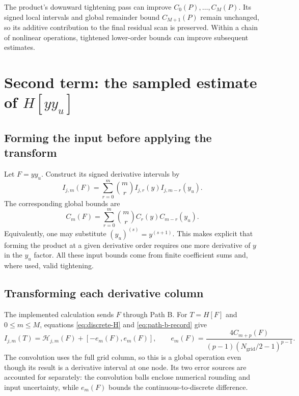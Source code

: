 \documentclass[11pt]{article}
\numberwithin{equation}{section}
\newcommand{\Ngrid}{N_{\mathrm{grid}}}
\begin{document}
The product's downward tightening pass can improve $C_0(P),\ldots,C_M(P)$.
Its signed local intervals and global remainder bound $C_{M+1}(P)$ remain
unchanged, so its additive contribution to the final residual scan is
preserved. Within a chain of nonlinear operations, tightened lower-order
bounds can improve subsequent estimates.

\section{Second term: the sampled estimate of \texorpdfstring{$H[yy_u]$}{H[yyu]}}
\label{sec:gravity-hilbert}

\subsection{Forming the input before applying the transform}

Let $F=yy_u$. Construct its signed derivative intervals by
\begin{equation}
 I_{j,m}(F)=\sum_{r=0}^{m}\binom mr
 I_{j,r}(y)I_{j,m-r}(y_u).
 \label{eq:F-local}
\end{equation}
The corresponding global bounds are
\begin{equation}
 C_m(F)=\sum_{r=0}^{m}\binom mr C_r(y)C_{m-r}(y_u).
 \label{eq:F-global}
\end{equation}
Equivalently, one may substitute $(y_u)^{(s)}=y^{(s+1)}$. This makes explicit
that forming the product at a given derivative order requires one more
derivative of $y$ in the $y_u$ factor. All these input bounds come from
finite coefficient sums and, where used, valid tightening.

\subsection{Transforming each derivative column}

The implemented calculation sends $F$ through Path B. For $T=H[F]$ and
$0\leq m\leq M$, equations \eqref{eq:discrete-H} and
\eqref{eq:path-b-record} give
\begin{equation}
 \boxed{I_{j,m}(T)=\mathcal H_{j,m}(F)
 +[-e_m(F),e_m(F)],\qquad
 e_m(F)=\frac{4C_{m+p}(F)}{(p-1)(\Ngrid/2-1)^{p-1}}.}
 \label{eq:T-local}
\end{equation}
The convolution uses the full grid column, so this is a global operation
even though its result is a derivative interval at one node. Its two error
sources are accounted for separately: the convolution balls enclose
numerical rounding and input uncertainty, while $e_m(F)$ bounds the
continuous-to-discrete difference.
\end{document}
